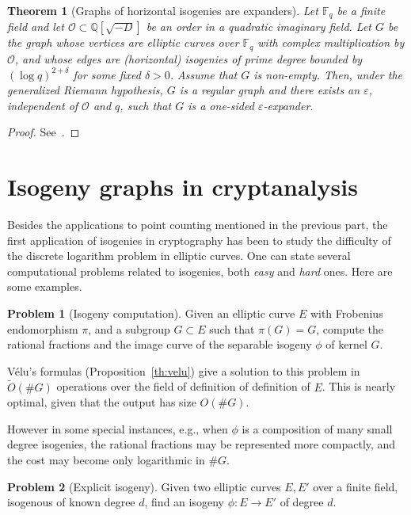 \documentclass[10pt]{article}
\theoremstyle{plain}
\newtheorem{theorem}{Theorem}
\theoremstyle{definition}
\newtheorem{problem}{Problem}
\def\F{\ensuremath{\mathbb{F}}}
\def\O{\ensuremath{\mathcal{O}}}
\def\tildO{\ensuremath{\tilde{O}}}
\begin{document}
\begin{theorem}[Graphs of horizontal isogenies are expanders]
  \label{th:ord-exp}
  Let $\F_q$ be a finite field and let $\O⊂ℚ[\sqrt{-D}]$ be an order
  in a quadratic imaginary field. %
  Let $G$ be the graph whose vertices are elliptic curves over $\F_q$
  with complex multiplication by $\O$, and whose edges are
  (horizontal) isogenies of prime degree bounded by $(\log q)^{2+δ}$
  for some fixed $δ>0$. %
  Assume that $G$ is non-empty. %
  Then, under the generalized Riemann hypothesis, $G$ is a regular
  graph and there exists an $ε$, independent of $\O$ and $q$, such
  that $G$ is a one-sided $ε$-expander.
\end{theorem}
\begin{proof}
  See~\cite{JMV}.
\end{proof}

\section{Isogeny graphs in cryptanalysis}
\label{sec:isog-graphs-crypt}

Besides the applications to point counting mentioned in the previous
part, the first application of isogenies in cryptography has been to
study the difficulty of the discrete logarithm problem in elliptic
curves. %
One can state several computational problems related to isogenies,
both \emph{easy} and \emph{hard} ones. %
Here are some examples.

\begin{problem}[Isogeny computation]
  Given an elliptic curve $E$ with Frobenius endomorphism $π$, and a
  subgroup $G⊂E$ such that $π(G)=G$, compute the rational fractions
  and the image curve of the separable isogeny $ϕ$ of kernel $G$.
\end{problem}

V\'elu's formulas (Proposition~\ref{th:velu}) give a solution to this
problem in $\tildO(\#G)$ operations over the field of definition of
definition of $E$. %
This is nearly optimal, given that the output has size $O(\#G)$.
  
However in some special instances, e.g., when $ϕ$ is a composition of
many small degree isogenies, the rational fractions may be represented
more compactly, and the cost may become only logarithmic in $\#G$.

\begin{problem}[Explicit isogeny]
  \label{prob:explicit-isog}
  Given two elliptic curves $E,E'$ over a finite field, isogenous
  of known degree $d$, find an isogeny $ϕ:E\to E'$ of degree $d$.
\end{problem}
\end{document}
